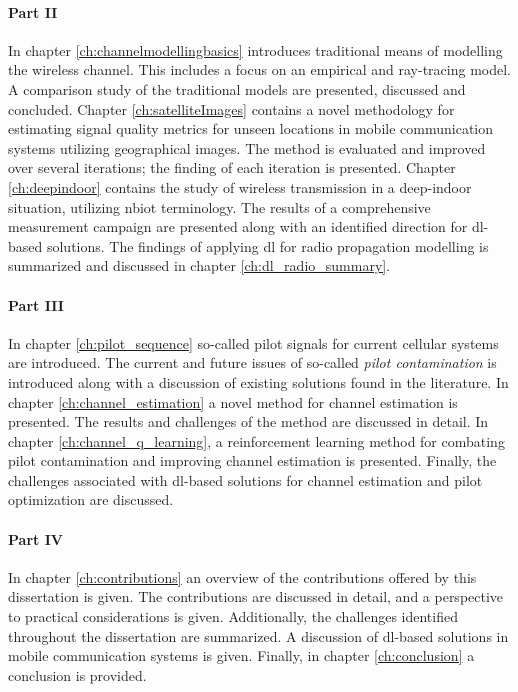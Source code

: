 \paragraph{Part II} In chapter \ref{ch:channelmodellingbasics} introduces traditional means of modelling the wireless channel. This includes a focus on an empirical and ray-tracing model. A comparison study of the traditional models are presented, discussed and concluded. Chapter \ref{ch:satelliteImages} contains a novel methodology for estimating signal quality metrics for unseen locations in mobile communication systems utilizing geographical images. The method is evaluated and improved over several iterations; the finding of each iteration is presented. Chapter \ref{ch:deepindoor} contains the study of wireless transmission in a deep-indoor situation, utilizing \gls{nbiot} terminology. The results of a comprehensive measurement campaign are presented along with an identified direction for \gls{dl}-based solutions.  The findings of applying \gls{dl} for radio propagation modelling is summarized and discussed in chapter \ref{ch:dl_radio_summary}.

\paragraph{Part III} In chapter \ref{ch:pilot_sequence} so-called pilot signals for current cellular systems are introduced. The current and future issues of so-called \emph{pilot contamination} is introduced along with a discussion of existing solutions found in the literature. In chapter \ref{ch:channel_estimation} a novel method for channel estimation is presented. The results and challenges of the method are discussed in detail. In chapter \ref{ch:channel_q_learning}, a reinforcement learning method for combating pilot contamination and improving channel estimation is presented. Finally, the challenges associated with \gls{dl}-based solutions for channel estimation and pilot optimization are discussed. 

\paragraph{Part IV} In chapter \ref{ch:contributions} an overview of the contributions offered by this dissertation is given. The contributions are discussed in detail, and a perspective to practical considerations is given. Additionally, the challenges identified throughout the dissertation are summarized. A discussion of \gls{dl}-based solutions in mobile communication systems is given. Finally, in chapter \ref{ch:conclusion} a conclusion is provided.




